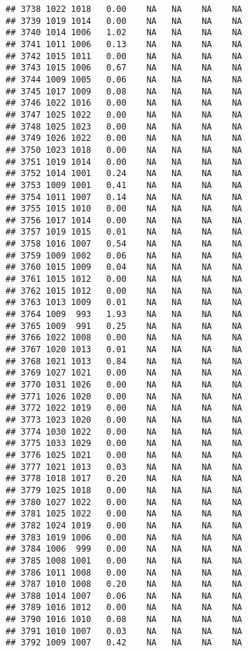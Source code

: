 \documentclass{article}\usepackage{graphicx, color}
\makeatletter
\newenvironment{kframe}{%
 \def\at@end@of@kframe{}%
 \ifinner\ifhmode%
  \def\at@end@of@kframe{\end{minipage}}%
  \begin{minipage}{\columnwidth}%
 \fi\fi%
 \def\FrameCommand##1{\hskip\@totalleftmargin \hskip-\fboxsep
 \colorbox{shadecolor}{##1}\hskip-\fboxsep
     \hskip-\linewidth \hskip-\@totalleftmargin \hskip\columnwidth}%
 \MakeFramed {\advance\hsize-\width
   \@totalleftmargin\z@ \linewidth\hsize
   \@setminipage}}%
 {\par\unskip\endMakeFramed%
 \at@end@of@kframe}
\newenvironment{knitrout}{}{} %
\makeatother
\begin{document}
\begin{knitrout}
\begin{kframe}
\begin{verbatim}
## 3738 1022 1018   0.00    NA   NA    NA    NA
## 3739 1019 1014   0.00    NA   NA    NA    NA
## 3740 1014 1006   1.02    NA   NA    NA    NA
## 3741 1011 1006   0.13    NA   NA    NA    NA
## 3742 1015 1011   0.00    NA   NA    NA    NA
## 3743 1015 1006   0.67    NA   NA    NA    NA
## 3744 1009 1005   0.06    NA   NA    NA    NA
## 3745 1017 1009   0.08    NA   NA    NA    NA
## 3746 1022 1016   0.00    NA   NA    NA    NA
## 3747 1025 1022   0.00    NA   NA    NA    NA
## 3748 1025 1023   0.00    NA   NA    NA    NA
## 3749 1026 1022   0.00    NA   NA    NA    NA
## 3750 1023 1018   0.00    NA   NA    NA    NA
## 3751 1019 1014   0.00    NA   NA    NA    NA
## 3752 1014 1001   0.24    NA   NA    NA    NA
## 3753 1009 1001   0.41    NA   NA    NA    NA
## 3754 1011 1007   0.14    NA   NA    NA    NA
## 3755 1015 1010   0.00    NA   NA    NA    NA
## 3756 1017 1014   0.00    NA   NA    NA    NA
## 3757 1019 1015   0.01    NA   NA    NA    NA
## 3758 1016 1007   0.54    NA   NA    NA    NA
## 3759 1009 1002   0.06    NA   NA    NA    NA
## 3760 1015 1009   0.04    NA   NA    NA    NA
## 3761 1015 1012   0.00    NA   NA    NA    NA
## 3762 1015 1012   0.00    NA   NA    NA    NA
## 3763 1013 1009   0.01    NA   NA    NA    NA
## 3764 1009  993   1.93    NA   NA    NA    NA
## 3765 1009  991   0.25    NA   NA    NA    NA
## 3766 1022 1008   0.00    NA   NA    NA    NA
## 3767 1020 1013   0.01    NA   NA    NA    NA
## 3768 1021 1013   0.84    NA   NA    NA    NA
## 3769 1027 1021   0.00    NA   NA    NA    NA
## 3770 1031 1026   0.00    NA   NA    NA    NA
## 3771 1026 1020   0.00    NA   NA    NA    NA
## 3772 1022 1019   0.00    NA   NA    NA    NA
## 3773 1023 1020   0.00    NA   NA    NA    NA
## 3774 1030 1022   0.00    NA   NA    NA    NA
## 3775 1033 1029   0.00    NA   NA    NA    NA
## 3776 1025 1021   0.00    NA   NA    NA    NA
## 3777 1021 1013   0.03    NA   NA    NA    NA
## 3778 1018 1017   0.20    NA   NA    NA    NA
## 3779 1025 1018   0.00    NA   NA    NA    NA
## 3780 1027 1022   0.00    NA   NA    NA    NA
## 3781 1025 1022   0.00    NA   NA    NA    NA
## 3782 1024 1019   0.00    NA   NA    NA    NA
## 3783 1019 1006   0.00    NA   NA    NA    NA
## 3784 1006  999   0.00    NA   NA    NA    NA
## 3785 1008 1001   0.00    NA   NA    NA    NA
## 3786 1011 1008   0.00    NA   NA    NA    NA
## 3787 1010 1008   0.20    NA   NA    NA    NA
## 3788 1014 1007   0.06    NA   NA    NA    NA
## 3789 1016 1012   0.00    NA   NA    NA    NA
## 3790 1016 1010   0.08    NA   NA    NA    NA
## 3791 1010 1007   0.03    NA   NA    NA    NA
## 3792 1009 1007   0.42    NA   NA    NA    NA

\end{verbatim}
\end{kframe}
\end{knitrout}
\end{document}
